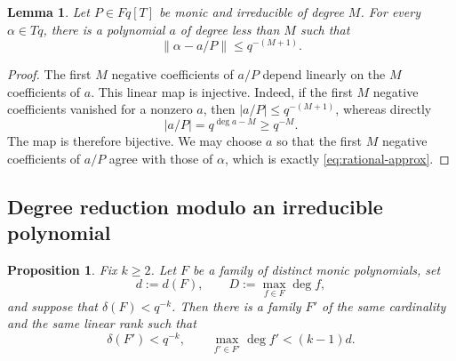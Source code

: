 \documentclass[11pt,reqno]{amsart}
\numberwithin{equation}{section}
\newtheorem{proposition}[proposition]{Proposition}
\newtheorem{lemma}[lemma]{Lemma}
\theoremstyle{definition}
\theoremstyle{remark}
\newcommand{\Fq}{\mathbb F_q}
\newcommand{\Torus}{\mathbb T_q}
\newcommand{\cF}{\mathcal F}
\newcommand{\abs}[1]{\lvert#1\rvert}
\newcommand{\norm}[1]{\lVert#1\rVert}
\def\Fq{Fq}%
\def\Torus{Tq}%
\def\mathbb#1{#1}%
\def\mathcal#1{#1}%
\begin{document}
\begin{lemma}\label{lem:rational-approx}
Let $P\in\Fq[T]$ be monic and irreducible of degree $M$.  For every
$\alpha\in\Torus$, there is a polynomial $a$ of degree less than $M$ such that
\begin{equation}\label{eq:rational-approx}
 \norm{\alpha-a/P}\le q^{-(M+1)}.
\end{equation}
\end{lemma}

\begin{proof}
The first $M$ negative coefficients of $a/P$ depend linearly on the $M$ coefficients of $a$.  This linear map is injective.  Indeed, if the first $M$ negative coefficients vanished for a nonzero $a$, then
$\abs{a/P}\le q^{-(M+1)}$, whereas directly
\[
 \abs{a/P}=q^{\deg a-M}\ge q^{-M}.
\]
The map is therefore bijective.  We may choose $a$ so that the first $M$ negative coefficients of $a/P$ agree with those of $\alpha$, which is exactly \eqref{eq:rational-approx}.
\end{proof}

\subsection{Degree reduction modulo an irreducible polynomial}

\begin{proposition}\label{prop:compression}
Fix $k\ge2$.  Let $\cF$ be a family of distinct monic polynomials, set
\[
 d:=d(\cF),
 \qquad
 D:=\max_{f\in\cF}\deg f,
\]
and suppose that $\delta(\cF)<q^{-k}$.  Then there is a family $\cF'$ of the same cardinality and the same linear rank such that
\begin{equation}\label{eq:compression-conclusion}
 \delta(\cF')<q^{-k},
 \qquad
 \max_{f'\in\cF'}\deg f'<(k-1)d.
\end{equation}
\end{proposition}
\end{document}
